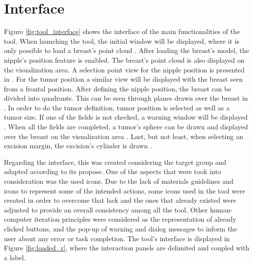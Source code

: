 \section{Interface}

Figure \ref{fig:tool_interface} shows the interface of the main functionalities of the tool. When launching the tool, the initial window will be displayed, where it is only possible to load a breast's point cloud . After loading the breast's model, the nipple's position feature is enabled. The breast's point cloud is also displayed on the visualization area. A selection point view for the nipple position is presented in . For the tumor position a similar view will be displayed with the breast seen from a frontal position. After defining the nipple position, the breast can be divided into quadrants. This can be seen through planes drawn over the breast in . In order to do the tumor definition, tumor position is selected as well as a tumor size. If one of the fields is not checked, a warning window will be displayed . When all the fields are completed, a tumor's sphere can be drawn and displayed over the breast on the visualization area . Last, but not least, when selecting an excision margin, the excision's cylinder is drawn .

Regarding the interface, this was created considering the target group and adapted according to its propose. One of the aspects that were took into consideration was the used icons. Due to the lack of materials guidelines and icons to represent some of the intended actions, some icons used in the tool were created in order to overcome that lack and the ones that already existed were adjusted to provide an overall consistency among all the tool. Other human-computer iteration principles were considered as the representation of already clicked buttons, and the pop-up of warning and dialog messages to inform the user about any error or task completion. The tool's interface is displayed in Figure \ref{fig:loaded_r}, where the interaction panels are delimited and coupled with a label.

